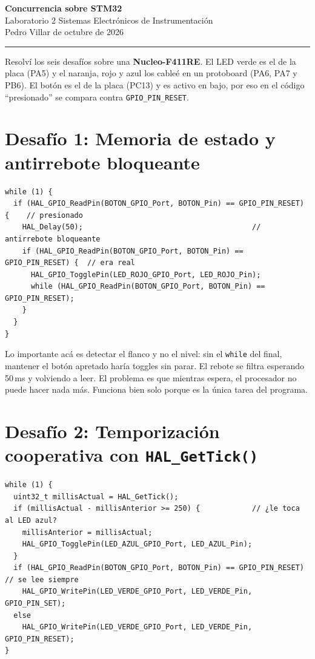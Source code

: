 \documentclass[11pt,a4paper]{article}
\begin{document}
\begin{center}
  {\large\bfseries Concurrencia sobre STM32}\\[2pt]
  {\small Laboratorio 2 \textbar{} Sistemas Electrónicos de Instrumentación}\\[2pt]
  {\footnotesize Pedro Villar \quad\textbar{} de octubre de 2026}
\end{center}
\vspace{-4pt}
\hrule
\vspace{4pt}

Resolví los seis desafíos sobre una \textbf{Nucleo-F411RE}.
El LED verde es el de la placa (PA5) y el naranja, rojo y azul los cableé en un protoboard
(PA6, PA7 y PB6). El botón es el de la placa (PC13) y es activo en bajo, por eso en el código
``presionado'' se compara contra \texttt{GPIO\_PIN\_RESET}.

\section*{Desafío 1: Memoria de estado y antirrebote bloqueante}

\begin{lstlisting}
while (1) {
  if (HAL_GPIO_ReadPin(BOTON_GPIO_Port, BOTON_Pin) == GPIO_PIN_RESET) {    // presionado
    HAL_Delay(50);                                       // antirrebote bloqueante
    if (HAL_GPIO_ReadPin(BOTON_GPIO_Port, BOTON_Pin) == GPIO_PIN_RESET) {  // era real
      HAL_GPIO_TogglePin(LED_ROJO_GPIO_Port, LED_ROJO_Pin);
      while (HAL_GPIO_ReadPin(BOTON_GPIO_Port, BOTON_Pin) == GPIO_PIN_RESET);
    }
  }
}
\end{lstlisting}

Lo importante acá es detectar el flanco y no el nivel: sin el \texttt{while} del final, mantener
el botón apretado haría toggles sin parar. El rebote se filtra esperando 50\,ms y volviendo a leer.
El problema es que mientras espera, el procesador no puede hacer nada más. Funciona bien solo
porque es la única tarea del programa.

\section*{Desafío 2: Temporización cooperativa con \texttt{HAL\_GetTick()}}

\begin{lstlisting}
while (1) {
  uint32_t millisActual = HAL_GetTick();
  if (millisActual - millisAnterior >= 250) {            // ¿le toca al LED azul?
    millisAnterior = millisActual;
    HAL_GPIO_TogglePin(LED_AZUL_GPIO_Port, LED_AZUL_Pin);
  }
  if (HAL_GPIO_ReadPin(BOTON_GPIO_Port, BOTON_Pin) == GPIO_PIN_RESET) // se lee siempre
    HAL_GPIO_WritePin(LED_VERDE_GPIO_Port, LED_VERDE_Pin, GPIO_PIN_SET);
  else
    HAL_GPIO_WritePin(LED_VERDE_GPIO_Port, LED_VERDE_Pin, GPIO_PIN_RESET);
}
\end{lstlisting}
\end{document}
